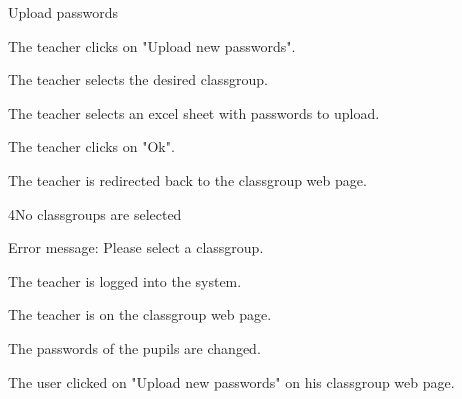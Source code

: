 \begin{uc}{Upload passwords}

    \begin{uc-mss}
    \item The teacher clicks on "Upload new passwords".
		\item The teacher selects the desired classgroup.
    \item The teacher selects an excel sheet with passwords to upload.
    \item The teacher clicks on "Ok".
    \item The teacher is redirected back to the classgroup web page.
    \end{uc-mss}

    \begin{uc-ext}

        \begin{uc-fail}{4}{No classgroups are selected}
        \item Error message: Please select a classgroup.
        \end{uc-fail}

    \end{uc-ext}

    \begin{uc-pre}
    \item The teacher is logged into the system.
    \item The teacher is on the classgroup web page.
    \end{uc-pre}

    \begin{uc-post}
    \item The passwords of the pupils are changed.
    \end{uc-post}

    \begin{uc-trig}
        The user clicked on "Upload new passwords" on his classgroup web page.
    \end{uc-trig}

\end{uc}
